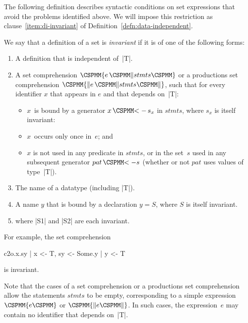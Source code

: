 The following definition describes syntactic conditions on set expressions
that avoid the problems identified above.  We will impose this restriction as
clause~\ref{item:di-invariant} of Definition~\ref{defn:data-independent}.
%
\begin{definition}
\label{def:invariant}
We say that a definition of a set is \emph{invariant} if it is of one of the
following forms:
%
\begin{enumerate}
\item A definition that is independent of~|T|.

\item\label{item:invariant-2} A set comprehension $\M\{ e \,\M\| stmts \M\}$
or a productions set comprehension $\M{\{\|} e \,\M\| stmts \M{\|\}}$, such
that for every identifier $x$ that appears in $e$ and that depends on~|T|:
  \begin{itemize}
  \item $x$~is bound by a generator $x \,\M{<-}\, s_x$ in $stmts$, where $s_x$ is
  itself invariant: 
  \item $x$~occurs only once in~$e$; and
  \item $x$ is not used in any predicate in $stmts$, or in the set~$s$ used in
  any subsequent generator $pat \,\M{<-} s$ (whether or not $pat$ uses values of
  type~|T|). 
  \end{itemize}

\item The name of a datatype (including |T|). 

\item A name $y$ that is bound by a declaration $y = S$, where $S$ is itself
invariant. 

\item {} where |S1| and |S2| are each invariant. 
\end{enumerate}
\end{definition}


For example, the set comprehension 
\begin{cspm}
{ c2o.x.sy | x <- T, sy <- {Some.y | y <- T} }
\end{cspm}
is invariant.

Note that the cases of a set comprehension or a productions set comprehension
allow the statements $stmts$ to be empty, corresponding to a simple expression
$\M\{ e \M\}$ or $\M{\{\|} e \M{\|\}}$.  In such cases, the expression~$e$ may
contain no identifier that depends on~|T|. 


